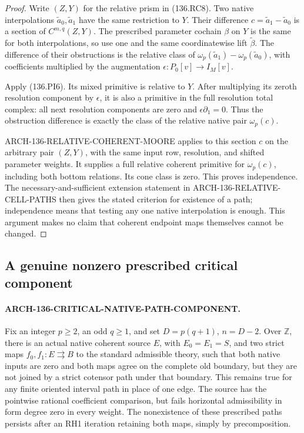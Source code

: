 \begin{proof}
Write \((Z,Y)\) for the relative prism in (136.RC8).
Two native interpolations \(\widetilde a_0,\widetilde a_1\)
have the same restriction to \(Y\).  Their difference
\(c=\widetilde a_1-\widetilde a_0\) is a section of
\(C^{m,q}(Z,Y)\).  The prescribed parameter cochain \(\beta\)
on \(Y\) is the same for both interpolations, so use one and
the same coordinatewise lift \(\widetilde\beta\).
The difference of their obstructions is the relative class of
\(\omega_p(\widetilde a_1)-\omega_p(\widetilde a_0)\),
with coefficients multiplied by the augmentation
\(\epsilon:P_0[v]\to I_M[v]\).

Apply (136.PI6).  Its mixed primitive is relative to \(Y\).
After multiplying its zeroth resolution component by \(\epsilon\),
it is also a primitive in the full resolution total complex:
all next resolution components are zero and
\(\epsilon\partial_1=0\).  Thus the obstruction difference
is exactly the class of the relative native pair \(\omega_p(c)\).

ARCH-136-RELATIVE-COHERENT-MOORE applies to this section \(c\)
on the arbitrary pair \((Z,Y)\), with the same input row,
resolution, and shifted parameter weights.  It supplies a full
relative coherent primitive for \(\omega_p(c)\), including
both bottom relations.  Its cone class is zero.  This proves
independence.  The necessary-and-sufficient extension statement
in ARCH-136-RELATIVE-CELL-PATHS then gives the stated criterion
for existence of a path; independence means that testing any one
native interpolation is enough.  This argument makes no claim
that coherent endpoint maps themselves cannot be changed.
\end{proof}

\subsection{A genuine nonzero prescribed critical component}

\paragraph{ARCH-136-CRITICAL-NATIVE-PATH-COMPONENT.}
Fix an integer \(p\geq2\), an odd \(q\geq1\), and set
\(D=p(q+1)\), \(n=D-2\).  Over \(\mathbb Z\), there is
an actual native coherent source \(E\), with \(E_0=E_1=S\),
and two strict maps \(f_0,f_1:E\rightrightarrows B\) to the
standard admissible theory, such that both native inputs are
zero and both maps agree on the complete old boundary, but they
are not joined by a strict cotensor path under that boundary.
This remains true for any finite oriented interval path in place
of one edge.  The source has the pointwise rational coefficient
comparison, but fails horizontal admissibility in form degree zero
in every weight.
The nonexistence of these prescribed paths persists after an RH1
iteration retaining both maps, simply by precomposition.

